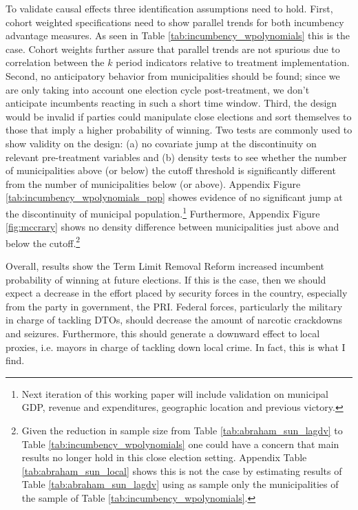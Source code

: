\documentclass[12pt]{amsart}
\numberwithin{equation}{section}
\theoremstyle{definition}
\theoremstyle{definition}
\theoremstyle{definition}
\begin{document}
To validate causal effects three identification assumptions need to hold. First, cohort weighted specifications need to show parallel trends for both incumbency advantage measures. As seen in Table \ref{tab:incumbency_wpolynomials}  this is the case. Cohort weights further assure that parallel trends are not spurious due to correlation between the $k$ period indicators relative to treatment implementation. Second, no anticipatory behavior from municipalities should be found; since we are only taking into account one election cycle post-treatment, we don't anticipate incumbents reacting in such a short time window. %
Third, the design would be invalid if parties could manipulate close elections and sort themselves to those that imply a higher probability of winning. Two tests are commonly used to show validity on the design: (a) no covariate jump at the discontinuity on relevant pre-treatment variables and (b) density tests to see whether the number of municipalities above (or below) the cutoff threshold is significantly different from the number of municipalities below (or above). Appendix Figure \ref{tab:incumbency_wpolynomials_pop} showes evidence of no significant jump at the discontinuity of municipal population.\footnote{Next iteration of this working paper will include validation on municipal GDP, revenue and expenditures, geographic location and previous victory.} Furthermore, Appendix Figure \ref{fig:mccrary} shows no density difference between municipalities just above and below the cutoff.\footnote{Given the reduction in sample size from Table \ref{tab:abraham_sun_lagdv} to Table \ref{tab:incumbency_wpolynomials} one could have a concern that main results no longer hold in this close election setting. Appendix Table \ref{tab:abraham_sun_local} shows this is not the case by estimating results of Table \ref{tab:abraham_sun_lagdv} using as sample only the municipalities of the sample of Table \ref{tab:incumbency_wpolynomials}.}   

Overall, results show the Term Limit Removal Reform increased incumbent probability of winning at future elections. If this is the case, then we should expect a decrease in the effort placed by security forces in the country, especially from the party in government, the PRI. Federal forces, particularly the military in charge of tackling DTOs, should decrease the amount of narcotic crackdowns and seizures. Furthermore, this should generate a downward effect to local proxies, i.e. mayors in charge of tackling down local crime. In fact, this is what I find. 
   \clearpage
\end{document}
